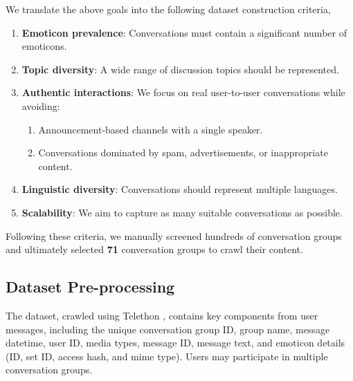 We translate the above goals into the following dataset construction criteria,
\begin{enumerate}
    \item \textbf{Emoticon prevalence}: Conversations must contain a significant number of emoticons.
    \item \textbf{Topic diversity}: A wide range of discussion topics should be represented.
    \item \textbf{Authentic interactions}: We focus on real user-to-user conversations while avoiding:
    \begin{enumerate}
        \item Announcement-based channels with a single speaker.
        \item Conversations dominated by spam, advertisements, or inappropriate content.
    \end{enumerate}
    \item \textbf{Linguistic diversity}: Conversations should represent multiple languages.
    \item \textbf{Scalability}: We aim to capture as many suitable conversations as possible.
\end{enumerate}

Following these criteria, we manually screened hundreds of conversation groups and ultimately selected \textbf{71} conversation groups to crawl their content.

\subsection{Dataset Pre-processing}
The dataset, crawled using Telethon \cite{telethon}, contains key components from user messages, including the unique conversation group ID, group name, message datetime, user ID, media types, message ID, message text, and emoticon details (ID, set ID, access hash, and mime type). Users may participate in multiple conversation groups.


